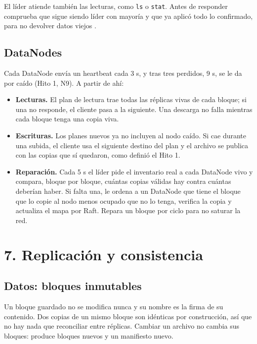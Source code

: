 \documentclass[10pt]{article}
\begin{document}
El líder atiende también las lecturas, como \texttt{ls} o \texttt{stat}. Antes de responder comprueba que sigue siendo líder con mayoría y que ya aplicó todo lo confirmado, para no devolver datos viejos .

\subsection{DataNodes}

Cada DataNode envía un heartbeat cada 3 s, y tras tres perdidos, 9 s, se le da por caído (Hito 1, N9). A partir de ahí:

\begin{itemize}
\item \textbf{Lecturas.} El plan de lectura trae todas las réplicas vivas de cada bloque; si una no responde, el cliente pasa a la siguiente. Una descarga no falla mientras cada bloque tenga una copia viva.
\item \textbf{Escrituras.} Los planes nuevos ya no incluyen al nodo caído. Si cae durante una subida, el cliente usa el siguiente destino del plan y el archivo se publica con las copias que sí quedaron, como definió el Hito 1.
\item \textbf{Reparación.} Cada 5 s el líder pide el inventario real a cada DataNode vivo y compara, bloque por bloque, cuántas copias válidas hay contra cuántas deberían haber. Si falta una, le ordena a un DataNode que tiene el bloque que lo copie al nodo menos ocupado que no lo tenga, verifica la copia y actualiza el mapa por Raft. Repara un bloque por ciclo para no saturar la red.
\end{itemize}

\separador

\section{7. Replicación y consistencia}

\subsection{Datos: bloques inmutables}

Un bloque guardado no se modifica nunca y su nombre es la firma de su contenido. Dos copias de un mismo bloque son idénticas por construcción, así que no hay nada que reconciliar entre réplicas. Cambiar un archivo no cambia sus bloques: produce bloques nuevos y un manifiesto nuevo.
\end{document}
